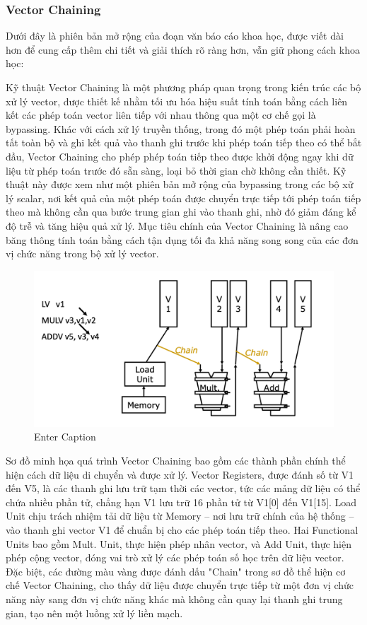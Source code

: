 \documentclass[a4paper]{article}
\begin{document}
\subsubsection{Vector Chaining}
Dưới đây là phiên bản mở rộng của đoạn văn báo cáo khoa học, được viết dài hơn để cung cấp thêm chi tiết và giải thích rõ ràng hơn, vẫn giữ phong cách khoa học:

Kỹ thuật Vector Chaining là một phương pháp quan trọng trong kiến trúc các bộ xử lý vector, được thiết kế nhằm tối ưu hóa hiệu suất tính toán bằng cách liên kết các phép toán vector liên tiếp với nhau thông qua một cơ chế gọi là bypassing. Khác với cách xử lý truyền thống, trong đó một phép toán phải hoàn tất toàn bộ và ghi kết quả vào thanh ghi trước khi phép toán tiếp theo có thể bắt đầu, Vector Chaining cho phép phép toán tiếp theo được khởi động ngay khi dữ liệu từ phép toán trước đó sẵn sàng, loại bỏ thời gian chờ không cần thiết. Kỹ thuật này được xem như một phiên bản mở rộng của bypassing trong các bộ xử lý scalar, nơi kết quả của một phép toán được chuyển trực tiếp tới phép toán tiếp theo mà không cần qua bước trung gian ghi vào thanh ghi, nhờ đó giảm đáng kể độ trễ và tăng hiệu quả xử lý. Mục tiêu chính của Vector Chaining là nâng cao băng thông tính toán bằng cách tận dụng tối đa khả năng song song của các đơn vị chức năng trong bộ xử lý vector.
\begin{figure}[H]
    \centering
    \includegraphics[width=1\linewidth]{assets/vector-chain.png}
    \caption{Enter Caption}
    \label{fig:enter-label}
\end{figure}
Sơ đồ minh họa quá trình Vector Chaining bao gồm các thành phần chính thể hiện cách dữ liệu di chuyển và được xử lý. Vector Registers, được đánh số từ V1 đến V5, là các thanh ghi lưu trữ tạm thời các vector, tức các mảng dữ liệu có thể chứa nhiều phần tử, chẳng hạn V1 lưu trữ 16 phần tử từ V1[0] đến V1[15]. Load Unit chịu trách nhiệm tải dữ liệu từ Memory – nơi lưu trữ chính của hệ thống – vào thanh ghi vector V1 để chuẩn bị cho các phép toán tiếp theo. Hai Functional Units bao gồm Mult. Unit, thực hiện phép nhân vector, và Add Unit, thực hiện phép cộng vector, đóng vai trò xử lý các phép toán số học trên dữ liệu vector. Đặc biệt, các đường màu vàng được đánh dấu "Chain" trong sơ đồ thể hiện cơ chế Vector Chaining, cho thấy dữ liệu được chuyển trực tiếp từ một đơn vị chức năng này sang đơn vị chức năng khác mà không cần quay lại thanh ghi trung gian, tạo nên một luồng xử lý liền mạch.
\end{document}
